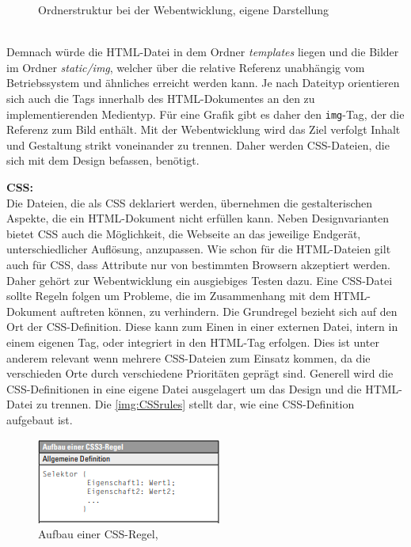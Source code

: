\documentclass[a4paper,titlepage,halfparskip,12pt]{scrreprt}
\begin{document}
\begin{onehalfspacing}
\begin{figure}[h]
	\caption{Ordnerstruktur bei der Webentwicklung, eigene Darstellung} 
	\label{img:TreeHTMLStruktur}
\end{figure}
\\Demnach würde die \ac{HTML}-Datei in dem Ordner \textit{templates} liegen und die Bilder im Ordner \textit{static/img}, welcher über die relative Referenz unabhängig vom Betriebssystem und ähnliches erreicht werden kann. Je nach Dateityp orientieren sich auch die Tags innerhalb des \ac{HTML}-Dokumentes an den zu implementierenden Medientyp. Für eine Grafik gibt es daher den \texttt{img}-Tag, der die Referenz zum Bild enthält. Mit der Webentwicklung wird das Ziel verfolgt Inhalt und Gestaltung strikt voneinander zu trennen. Daher werden \ac{CSS}-Dateien, die sich mit dem Design befassen, benötigt.\cite{buhler2017html5}

\textbf{CSS:}\\
Die Dateien, die als \ac{CSS} deklariert werden, übernehmen die gestalterischen Aspekte, die ein \ac{HTML}-Dokument nicht erfüllen kann. Neben Designvarianten bietet \ac{CSS} auch die Möglichkeit, die Webseite an das jeweilige Endgerät, unterschiedlicher Auflösung, anzupassen. Wie schon für die \ac{HTML}-Dateien gilt auch für \ac{CSS}, dass Attribute nur von bestimmten Browsern akzeptiert werden. Daher gehört zur Webentwicklung ein ausgiebiges Testen dazu. Eine \ac{CSS}-Datei sollte Regeln folgen um Probleme, die im Zusammenhang mit dem HTML-Dokument auftreten können, zu verhindern. Die Grundregel bezieht sich auf den Ort der \ac{CSS}-Definition. Diese kann zum Einen in einer externen Datei, intern in einem eigenen Tag, oder integriert in den \ac{HTML}-Tag erfolgen. Dies ist unter anderem relevant wenn mehrere \ac{CSS}-Dateien zum Einsatz kommen, da die verschieden Orte durch verschiedene Prioritäten geprägt sind. Generell wird die \ac{CSS}-Definitionen in eine eigene Datei ausgelagert um das Design und die \ac{HTML}-Datei zu trennen. Die \autoref{img:CSSrules} stellt dar, wie eine \ac{CSS}-Definition aufgebaut ist.
\begin{figure}[h]
	\centering
	\includegraphics[scale=2.5]{images/CSS_Definition}
	\caption{Aufbau einer \ac{CSS}-Regel, \cite{buhler2017html5}}
	\label{img:CSSrules}
\end{figure}	

\end{onehalfspacing}
\end{document}
